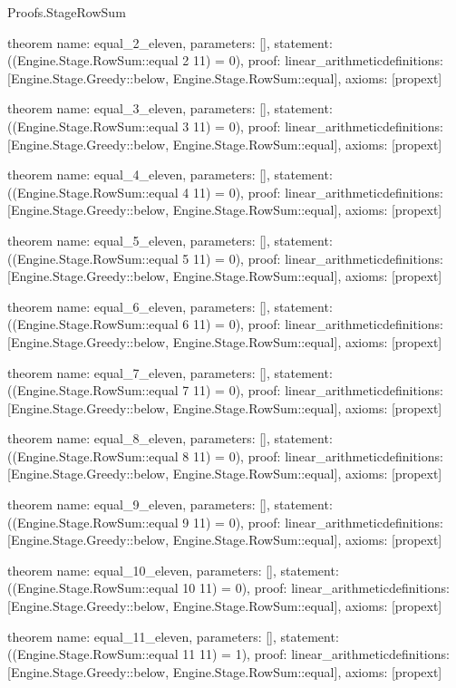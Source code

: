 \begin{lexlean}{Proofs.StageRowSum}
\begin{semanticmodule}
theorem{
  name: equal_2_eleven,
  parameters: [],
  statement: ((Engine.Stage.RowSum::equal 2 11) = 0),
  proof: linear_arithmetic{definitions: [Engine.Stage.Greedy::below, Engine.Stage.RowSum::equal]},
  axioms: [propext]
}

theorem{
  name: equal_3_eleven,
  parameters: [],
  statement: ((Engine.Stage.RowSum::equal 3 11) = 0),
  proof: linear_arithmetic{definitions: [Engine.Stage.Greedy::below, Engine.Stage.RowSum::equal]},
  axioms: [propext]
}

theorem{
  name: equal_4_eleven,
  parameters: [],
  statement: ((Engine.Stage.RowSum::equal 4 11) = 0),
  proof: linear_arithmetic{definitions: [Engine.Stage.Greedy::below, Engine.Stage.RowSum::equal]},
  axioms: [propext]
}

theorem{
  name: equal_5_eleven,
  parameters: [],
  statement: ((Engine.Stage.RowSum::equal 5 11) = 0),
  proof: linear_arithmetic{definitions: [Engine.Stage.Greedy::below, Engine.Stage.RowSum::equal]},
  axioms: [propext]
}

theorem{
  name: equal_6_eleven,
  parameters: [],
  statement: ((Engine.Stage.RowSum::equal 6 11) = 0),
  proof: linear_arithmetic{definitions: [Engine.Stage.Greedy::below, Engine.Stage.RowSum::equal]},
  axioms: [propext]
}

theorem{
  name: equal_7_eleven,
  parameters: [],
  statement: ((Engine.Stage.RowSum::equal 7 11) = 0),
  proof: linear_arithmetic{definitions: [Engine.Stage.Greedy::below, Engine.Stage.RowSum::equal]},
  axioms: [propext]
}

theorem{
  name: equal_8_eleven,
  parameters: [],
  statement: ((Engine.Stage.RowSum::equal 8 11) = 0),
  proof: linear_arithmetic{definitions: [Engine.Stage.Greedy::below, Engine.Stage.RowSum::equal]},
  axioms: [propext]
}

theorem{
  name: equal_9_eleven,
  parameters: [],
  statement: ((Engine.Stage.RowSum::equal 9 11) = 0),
  proof: linear_arithmetic{definitions: [Engine.Stage.Greedy::below, Engine.Stage.RowSum::equal]},
  axioms: [propext]
}

theorem{
  name: equal_10_eleven,
  parameters: [],
  statement: ((Engine.Stage.RowSum::equal 10 11) = 0),
  proof: linear_arithmetic{definitions: [Engine.Stage.Greedy::below, Engine.Stage.RowSum::equal]},
  axioms: [propext]
}

theorem{
  name: equal_11_eleven,
  parameters: [],
  statement: ((Engine.Stage.RowSum::equal 11 11) = 1),
  proof: linear_arithmetic{definitions: [Engine.Stage.Greedy::below, Engine.Stage.RowSum::equal]},
  axioms: [propext]
}


\end{semanticmodule}
\end{lexlean}

